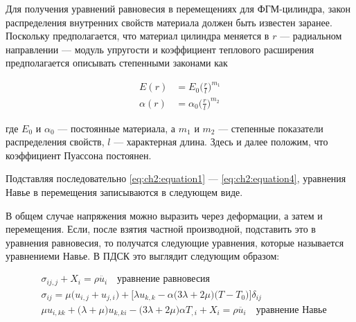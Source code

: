 Для получения уравнений равновесия в перемещениях
для ФГМ-цилиндра, закон распределения внутренних свойств материала должен быть известен заранее. Поскольку предполагается, что материал цилиндра меняется в \(r\) --- радиальном направлении --- модуль упругости и коэффициент теплового расширения предполагается описывать степенными законами как

\begin{equation}
	\label{eq:ch2:equation4}
	\begin{split}
		E(r) &= E_0 \big ( \frac{r}{l} \big) ^ {m_1} \\
		\alpha (r) &= \alpha_0 \big ( \frac{r}{l} \big) ^{ m_2}
	\end{split}
\end{equation}

где \(E_0\) и \(\alpha_0 \) --- постоянные материала, а \(m_1\) и \(m_2\) --- степенные показатели распределения свойств, \(l\) --- характерная длина. Здесь и далее положим,
что коэффициент Пуассона постоянен.

Подставляя последовательно \cref{eq:ch2:equation1} --- \cref{eq:ch2:equation4}, уравнения Навье в перемещения записываются в следующем виде.
\begin{adjustwidth}{3.5em}{3.5em} В общем случае напряжения можно выразить через деформации, а затем и перемещения. Если, после взятия частной производной, подставить это в уравнения равновесия, то получатся следующие уравнения, которые называется уравнениеми Навье. В ПДСК это выглядит следующим образом:

\begin{equation*}
\begin{split}
	&\sigma_{ij,j} + X_i = \rho \ddot{u_i} \quad \text{уравнение равновесия} \\
	&\sigma_{ij} = \mu \big (u_{i,j} + u_{j,i} \big ) + \big [ \lambda u_{k,k} - \alpha \big (3 \lambda +2\mu \big ) \big (T-T_0 \big ) \big ] \delta_{ij}\\
	&\mu u_{i,kk} + \big ( \lambda + \mu \big ) u_{k,ki} - \big ( 3 \lambda + 2\mu \big ) \alpha T_{,i} +X_i = \rho \ddot{u_i} \quad \text{уравнение Навье}
\end{split}
\end{equation*}
\end{adjustwidth}


